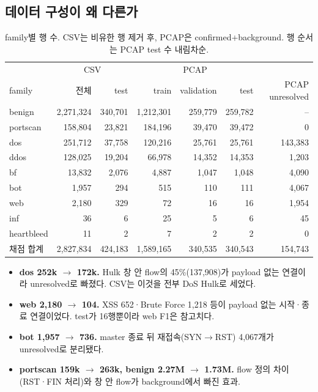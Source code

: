 \subsection{데이터 구성이 왜 다른가}
\begin{table}[H]
\centering\small
\caption{family별 행 수. CSV는 비유한 행 제거 후, PCAP은 confirmed+background. 행 순서는 PCAP test 수 내림차순.}
\begin{tabular}{lrr|rrr|r}
\toprule & \multicolumn{2}{c|}{CSV} & \multicolumn{3}{c|}{PCAP} & \\
family & 전체 & test & train & validation & test & PCAP unresolved\\\midrule
benign & 2,271,324 & 340,701 & 1,212,301 & 259,779 & 259,782 & --\\
portscan & 158,804 & 23,821 & 184,196 & 39,470 & 39,472 & 0\\
dos & 251,712 & 37,758 & 120,216 & 25,761 & 25,761 & 143,383\\
ddos & 128,025 & 19,204 & 66,978 & 14,352 & 14,353 & 1,203\\
bf & 13,832 & 2,076 & 4,887 & 1,047 & 1,048 & 4,090\\
bot & 1,957 & 294 & 515 & 110 & 111 & 4,067\\
web & 2,180 & 329 & 72 & 16 & 16 & 1,954\\
inf & 36 & 6 & 25 & 5 & 6 & 45\\
heartbleed & 11 & 2 & 7 & 2 & 2 & 0\\\midrule
채점 합계 & 2,827,834 & 424,183 & 1,589,165 & 340,535 & 340,543 & 154,743\\
\bottomrule
\end{tabular}
\end{table}
\begin{itemize}
\item \textbf{dos 252k $\to$ 172k.} Hulk 창 안 flow의 45\%(137,908)가 payload 없는 연결이라 unresolved로 빠졌다. CSV는 이것을 전부 DoS Hulk로 세었다.
\item \textbf{web 2,180 $\to$ 104.} XSS 652·Brute Force 1,218 등이 payload 없는 시작·종료 연결이었다. test가 16행뿐이라 web F1은 참고치다.
\item \textbf{bot 1,957 $\to$ 736.} master 종료 뒤 재접속(SYN$\to$RST) 4,067개가 unresolved로 분리됐다.
\item \textbf{portscan 159k $\to$ 263k, benign 2.27M $\to$ 1.73M.} flow 정의 차이(RST·FIN 처리)와 창 안 flow가 background에서 빠진 효과.
\end{itemize}

